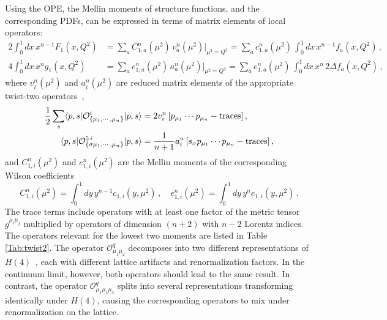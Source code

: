 Using the OPE, the Mellin moments of structure functions, and the corresponding PDFs, can be expressed in terms of matrix elements of local operators:
\begin{align}
\!\!\!2 \int_0^1 dx\, x^{n-1} F_1(x,Q^2) &= \sum_a C_{1,a}^n(\mu^2)\, v_a^n(\mu^2)|_{\mu^2=Q^2} = \sum_a c_{1,a}^n(\mu^2)\, \int_0^1 dx\, x^{n-1} f_a(x,Q^2)\,,\\
4 \int_0^1 dx\, x^n g_1(x,Q^2) &= \sum_a e_{1,a}^n(\mu^2)\, a_a^n(\mu^2)|_{\mu^2=Q^2} = \sum_a e_{1,a}^n(\mu^2)\, \int_0^1 dx\, x^n\, 2 \Delta f_a(x,Q^2)\,,
\end{align}
where $v_i^n(\mu^2)$ and $a_i^n(\mu^2)$ are reduced matrix elements of the appropriate twist-two operators~\cite{Gockeler:1995wg},
\begin{align}
\frac{1}{2} \sum_s \langle p,s|\mathcal{O}^i_{\{\mu_1,\cdots,\mu_n\}}|p,s\rangle = {} & 2 v_i^n\, [p_{\mu_1}\cdots p_{\mu_n} - {\rm traces}] \,, \label{eq:twist2me}\\
\langle p,s|\mathcal{O}^{5\,i}_{\{\sigma \mu_1,\cdots,\mu_n\}}|p,s\rangle = {} & \frac{1}{n+1} a_i^n\, [s_\sigma p_{\mu_1}\cdots p_{\mu_n} - {\rm traces}]\,,
\end{align}
and $C_{1,i}^n(\mu^2)$ and $e_{1,i}^n(\mu^2)$ are the Mellin moments of the corresponding Wilson coefficients
\begin{equation}
C_{1,i}^n(\mu^2) = \int_0^1 dy\, y^{n-1} c_{1,i}(y,\mu^2)\,, \quad
e_{1,i}^n(\mu^2) = \int_0^1 dy\, y^n e_{1,i}(y,\mu^2)\,.
\end{equation}
The trace terms include operators with at least one factor of the metric tensor $g^{\mu_i \mu_j}$ multiplied by
operators of dimension $(n+2)$ with $n-2$ Lorentz indices. The operators relevant for the lowest two moments are listed in Table \ref{Tab:twist2}. The operator $\mathcal{O}^q_{\mu_1\mu_2}$ decomposes into two different representations of $H(4)$~\cite{Gockeler:1996mu}, each with different lattice artifacts and renormalization factors. In the continuum limit, however, both operators should lead to the same result. In contrast, the operator $\mathcal{O}^q_{\mu_1\mu_2\mu_3}$ splits into several representations transforming identically under $H(4)$, causing the corresponding operators to mix under renormalization on the lattice.

